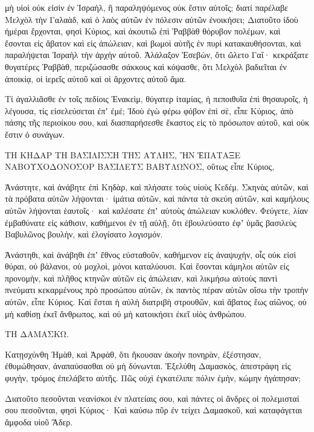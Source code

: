 {\par }{\PP μὴ υἱοὶ οὐκ εἰσὶν ἐν Ἰσραὴλ, ἢ παραληψόμενος οὐκ ἔστιν αὐτοῖς; διατί παρέλαβε Μελχὸλ τὴν Γαλαὰδ, καὶ ὁ λαὸς αὐτῶν ἐν πόλεσιν αὐτῶν ἐνοικήσει;
Διατοῦτο ἰδοὺ ἡμέραι ἔρχονται, φησὶ Κύριος, καὶ ἀκουτιῶ ἐπὶ Ῥαββὰθ θόρυβον πολέμων, καὶ ἔσονται εἰς ἄβατον καὶ εἰς ἀπώλειαν, καὶ βωμοὶ αὐτῆς ἐν πυρὶ κατακαυθήσονται, καὶ παραλήψεται Ἰσραὴλ τὴν ἀρχὴν αὐτοῦ.
Ἀλάλαξον Ἐσεβὼν, ὅτι ὤλετο Γαΐ· κεκράξατε θυγατέρες Ῥαββὰθ, περιζώσασθε σάκκους καὶ κόψασθε, ὅτι Μελχὸλ βαδιεῖται ἐν ἀποικίᾳ, οἱ ἱερεῖς αὐτοῦ καὶ οἱ ἄρχοντες αὐτοῦ ἅμα.
\par }{\PP {}Τί ἀγαλλιᾶσθε ἐν τοῖς πεδίοις Ἐνακεὶμ, θύγατερ ἰταμίας, ἡ πεποιθυῖα ἐπὶ θησαυροῖς, ἡ λέγουσα, τίς εἰσελεύσεται ἐπʼ ἐμέ;
Ἰδοὺ ἐγὼ φέρω φόβον ἐπὶ σὲ, εἶπε Κύριος, ἀπὸ πάσης τῆς περιοίκου σου, καὶ διασπαρήσεσθε ἕκαστος εἰς τὸ πρόσωπον αὐτοῦ, καὶ οὐκ ἔστιν ὁ συνάγων.
\par }{\PP {}ΤΗ ΚΗΔΑΡ ΤΗ ΒΑΣΙΛΙΣΣΗ ΤΗΣ ΑΥΛΗΣ, ἫΝ ἘΠΑΤΑΞΕ ΝΑΒΟΥΧΟΔΟΝΟΣΟΡ ΒΑΣΙΛΕΥΣ ΒΑΒΥΛΩΝΟΣ, οὕτως εἶπε Κύριος,
\par }{\PP Ἀνάστητε, καὶ ἀνάβητε ἐπὶ Κηδὰρ, καὶ πλήσατε τοὺς υἱοὺς Κεδέμ.
Σκηνὰς αὐτῶν, καὶ τὰ πρόβατα αὐτῶν λήψονται· ἱμάτια αὐτῶν, καὶ πάντα τὰ σκεύη αὐτῶν, καὶ καμήλους αὐτῶν λήψονται ἑαυτοῖς· καὶ καλέσατε ἐπʼ αὐτοὺς ἀπώλειαν κυκλόθεν.
Φεύγετε, λίαν ἐμβαθύνατε εἰς κάθισιν, καθήμενοι ἐν τῇ αὐλῇ, ὅτι ἐβουλεύσατο ἐφʼ ὑμᾶς βασιλεὺς Βαβυλῶνος βουλὴν, καὶ ἐλογίσατο λογισμόν.
\par }{\PP {}Ἀνάστηθι, καὶ ἀνάβηθι ἐπʼ ἔθνος εὐσταθοῦν, καθήμενον εἰς ἀναψυχὴν, οἷς οὐκ εἰσὶ θύραι, οὐ βάλανοι, οὐ μοχλοὶ, μόνοι καταλύουσι.
Καὶ ἔσονται κάμηλοι αὐτῶν εἰς προνομὴν, καὶ πλῆθος κτηνῶν αὐτῶν εἰς ἀπώλειαν, καὶ λικμήσω αὐτοὺς παντὶ πνεύματι κεκαρμένους πρὸ προσώπου αὐτῶν, ἐκ παντὸς πέραν αὐτῶν οἴσω τὴν τροπὴν αὐτῶν, εἶπε Κύριος.
Καὶ ἔσται ἡ αὐλὴ διατριβὴ στρουθῶν, καὶ ἄβατος ἕως αἰῶνος, οὐ μὴ καθίσῃ ἐκεῖ ἄνθρωπος, καὶ οὐ μὴ κατοικήσει ἐκεῖ υἱὸς ἀνθρώπου.
\par }{\PP {}ΤΗ ΔΑΜΑΣΚΩ. 
\par }{\PP Κατῃσχύνθη Ἠμὰθ, καὶ Ἀρφὰθ, ὅτι ἤκουσαν ἀκοὴν πονηρὰν, ἐξέστησαν, ἐθυμώθησαν, ἀναπαύσασθαι οὐ μὴ δύνωνται.
Ἐξελύθη Δαμασκὸς, ἀπεστράφη εἰς φυγὴν, τρόμος ἐπελάβετο αὐτῆς.
Πῶς οὐχὶ ἐγκατέλιπε πόλιν ἐμὴν, κώμην ἠγάπησαν;
\par }{\PP {}Διατοῦτο πεσοῦνται νεανίσκοι ἐν πλατείαις σου, καὶ πάντες οἱ ἄνδρες οἱ πολεμισταί σου πεσοῦνται, φησὶ Κύριος·
Καὶ καύσω πῦρ ἐν τείχει Δαμασκοῦ, καὶ καταφάγεται ἄμφοδα υἱοῦ Ἄδερ.

}
